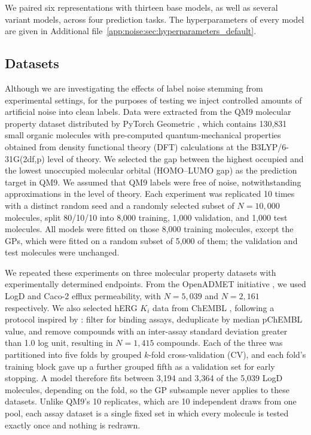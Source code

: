 We paired six representations with thirteen base models, as well as several variant models, across four prediction tasks. The hyperparameters of every model are given in Additional file~\ref{app:noise:sec:hyperparameters_default}.

\subsection{Datasets}\label{sec:robustness:datasets}

Although we are investigating the effects of label noise stemming from experimental settings, for the purposes of testing we inject controlled amounts of artificial noise into clean labels. Data were extracted from the QM9 molecular property dataset distributed by PyTorch Geometric \citep{Ramakrishnan2014}, which contains 130,831 small organic molecules with pre-computed quantum-mechanical properties obtained from density functional theory (DFT) calculations at the B3LYP/6-31G(2df,p) level of theory. We selected the gap between the highest occupied and the lowest unoccupied molecular orbital (HOMO--LUMO gap) as the prediction target in QM9. We assumed that QM9 labels were free of noise, notwithstanding approximations in the level of theory. Each experiment was replicated 10 times with a distinct random seed and a randomly selected subset of $N = 10{,}000$ molecules, split 80/10/10 into 8,000 training, 1,000 validation, and 1,000 test molecules. All models were fitted on those 8,000 training molecules, except the GPs, which were fitted on a random subset of 5,000 of them; the validation and test molecules were unchanged.

We repeated these experiments on three molecular property datasets with experimentally determined endpoints. From the OpenADMET initiative \citep{openadmet}, we used LogD and Caco-2 efflux permeability, with $N = 5{,}039$ and $N = 2{,}161$ respectively. We also selected hERG $K_i$ data from ChEMBL \citep{Zdrazil2023}, following a protocol inspired by \citet{landrum2024}: filter for binding assays, deduplicate by median pChEMBL value, and remove compounds with an inter-assay standard deviation greater than 1.0 log unit, resulting in $N = 1{,}415$ compounds. Each of the three was partitioned into five folds by grouped $k$-fold cross-validation (CV), and each fold's training block gave up a further grouped fifth as a validation set for early stopping. A model therefore fits between 3,194 and 3,364 of the 5,039 LogD molecules, depending on the fold, so the GP subsample never applies to these datasets. Unlike QM9's 10 replicates, which are 10 independent draws from one pool, each assay dataset is a single fixed set in which every molecule is tested exactly once and nothing is redrawn.


